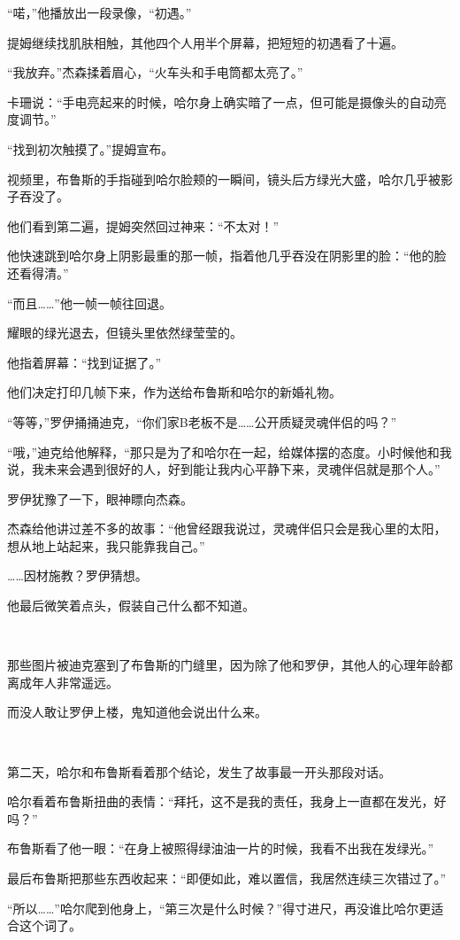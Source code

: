 \documentclass[../main.tex]{subfiles}
\begin{document}
“喏，”他播放出一段录像，“初遇。”

提姆继续找肌肤相触，其他四个人用半个屏幕，把短短的初遇看了十遍。

“我放弃。”杰森揉着眉心，“火车头和手电筒都太亮了。”

卡珊说：“手电亮起来的时候，哈尔身上确实暗了一点，但可能是摄像头的自动亮度调节。”

“找到初次触摸了。”提姆宣布。

视频里，布鲁斯的手指碰到哈尔脸颊的一瞬间，镜头后方绿光大盛，哈尔几乎被影子吞没了。

他们看到第二遍，提姆突然回过神来：“不太对！”

他快速跳到哈尔身上阴影最重的那一帧，指着他几乎吞没在阴影里的脸：“他的脸还看得清。”

“而且……”他一帧一帧往回退。

耀眼的绿光退去，但镜头里依然绿莹莹的。

他指着屏幕：“找到证据了。”

他们决定打印几帧下来，作为送给布鲁斯和哈尔的新婚礼物。

“等等，”罗伊捅捅迪克，“你们家B老板不是……公开质疑灵魂伴侣的吗？”

“哦，”迪克给他解释，“那只是为了和哈尔在一起，给媒体摆的态度。小时候他和我说，我未来会遇到很好的人，好到能让我内心平静下来，灵魂伴侣就是那个人。”

罗伊犹豫了一下，眼神瞟向杰森。

杰森给他讲过差不多的故事：“他曾经跟我说过，灵魂伴侣只会是我心里的太阳，想从地上站起来，我只能靠我自己。”

……因材施教？罗伊猜想。

他最后微笑着点头，假装自己什么都不知道。

~\

那些图片被迪克塞到了布鲁斯的门缝里，因为除了他和罗伊，其他人的心理年龄都离成年人非常遥远。

而没人敢让罗伊上楼，鬼知道他会说出什么来。

~\

第二天，哈尔和布鲁斯看着那个结论，发生了故事最一开头那段对话。

哈尔看着布鲁斯扭曲的表情：“拜托，这不是我的责任，我身上一直都在发光，好吗？”

布鲁斯看了他一眼：“在身上被照得绿油油一片的时候，我看不出我在发绿光。”

最后布鲁斯把那些东西收起来：“即便如此，难以置信，我居然连续三次错过了。”

“所以……”哈尔爬到他身上，“第三次是什么时候？”得寸进尺，再没谁比哈尔更适合这个词了。
\end{document}
